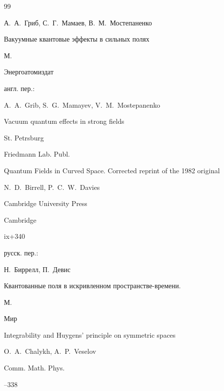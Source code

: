 \begin{thebibliography}{99}




\by А.~А.~Гриб, С.~Г.~Мамаев, В.~М.~Мостепаненко

\book Вакуумные квантовые эффекты в сильных полях

\publaddr М.

\publ Энергоатомиздат



\transl англ. пер.:~

\by A.~A.~Grib, S.~G.~Mamayev, V.~M.~Mostepanenko

\book Vacuum quantum effects in strong fields

\publaddr  St. Petrsburg

\publ Friedmann Lab. Publ.












\book Quantum Fields in Curved Space. Corrected reprint of the 1982 original

\by N.~D.~Birrell, P.~C.~W.~Davies

\publ Cambridge University Press

\publaddr Cambridge 


\totalpages ix+340

\rtransl русск. пер.:~

\by Н.~Биррелл, П.~Девис

\book Квантованные поля в искривленном пространстве-времени.

\publaddr М.

\publ Мир






\paper Integrability and Huygens' principle on symmetric spaces

\by   O.~A.~Chalykh, A.~P.~Veselov

\jour Comm. Math. Phys.




--338







\end{thebibliography}







